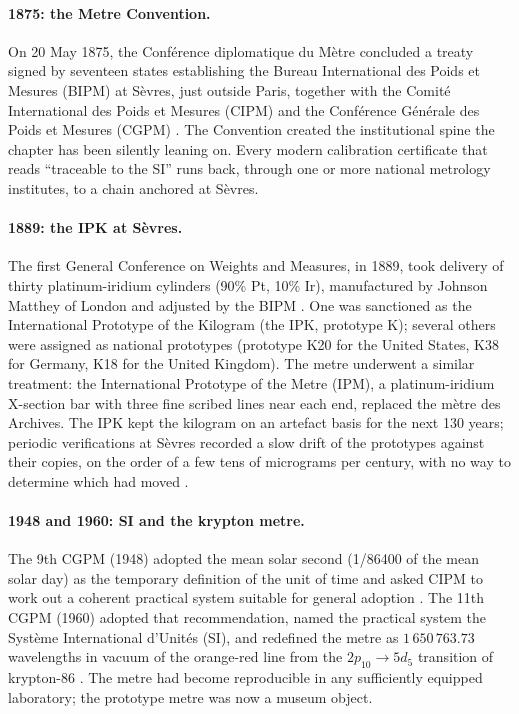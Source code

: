 \paragraph{1875: the Metre Convention.}

On 20 May 1875, the Conf\'erence diplomatique du M\`etre concluded a
treaty signed by seventeen states establishing the Bureau
International des Poids et Mesures (BIPM) at S\`evres, just outside
Paris, together with the Comit\'e International des Poids et Mesures
(CIPM) and the Conf\'erence G\'en\'erale des Poids et Mesures (CGPM)
\cite{hist:ch01t3-metre-convention-1875}. The Convention created the
institutional spine the chapter has been silently leaning on. Every
modern calibration certificate that reads ``traceable to the SI''
runs back, through one or more national metrology institutes, to a
chain anchored at S\`evres.

\paragraph{1889: the IPK at S\`evres.}

The first General Conference on Weights and Measures, in 1889, took
delivery of thirty platinum-iridium cylinders (90\% Pt, 10\% Ir),
manufactured by Johnson Matthey of London and adjusted by the BIPM
\cite{hist:ch01t3-cgpm1-1889}. One was sanctioned as the
International Prototype of the Kilogram (the IPK, prototype K);
several others were assigned as national prototypes (prototype K20
for the United States, K38 for Germany, K18 for the United Kingdom).
The metre underwent a similar treatment: the International Prototype
of the Metre (IPM), a platinum-iridium X-section bar with three
fine scribed lines near each end, replaced the m\`etre des Archives.
The IPK kept the kilogram on an artefact basis for the next 130
years; periodic verifications at S\`evres recorded a slow drift of
the prototypes against their copies, on the order of a few tens of
micrograms per century, with no way to determine which had moved
\cite{paper:girard-ipk-1994}.

\paragraph{1948 and 1960: SI and the krypton metre.}

The 9th CGPM (1948) adopted the mean solar second (1/86400 of the
mean solar day) as the temporary definition of the unit of time and
asked CIPM to work out a coherent practical system suitable for
general adoption \cite{hist:ch01t3-cgpm9-1948}. The 11th CGPM (1960)
adopted that recommendation, named the practical system the Syst\`eme
International d'Unit\'es (SI), and redefined the metre as
$1\,650\,763.73$ wavelengths in vacuum of the orange-red line from
the $2p_{10} \to 5d_5$ transition of krypton-86
\cite{hist:ch01t3-cgpm11-1960}. The metre had become reproducible in
any sufficiently equipped laboratory; the prototype metre was now a
museum object.

